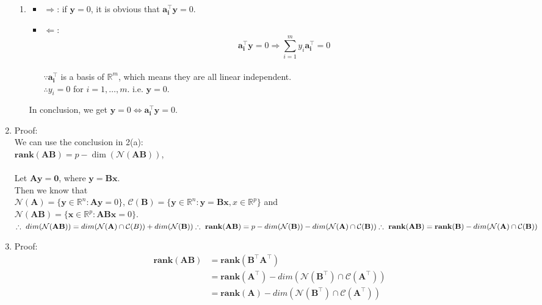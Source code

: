 \documentclass[11pt,letter,notitlepage]{article}
\newcommand{\rank}[1]{ \textbf{rank}  (#1)  }
\begin{document}
\begin{solution}
\begin{enumerate}
\begin{enumerate}
            \item 
            \begin{itemize}
                \item $\Rightarrow$: if $\mathbf{y}=0$, it is obvious that $\mathbf{a_{i}^{\top}y}=0.$\\
                \item $\Leftarrow$: $$\mathbf{a_{i}^{\top}y}=0 \Rightarrow \sum_{i=1}^{m}{y_i\mathbf{a_i^{\top}}=0}$$\\
                $\because \mathbf{a_i^{\top}}$ is a basis of $\mathbb{R}^m$, which means they are all linear independent.\\
                $\therefore y_i=0$ for $i = 1,\dots,m$. i.e. $\mathbf{y}=0.$
            \end{itemize} 
            In conclusion, we get $\mathbf{y}=0 \Leftrightarrow \mathbf{a_{i}^{\top}y}=0$.
        \end{enumerate}
		
		\item Proof:\\
		We can use the conclusion in 2(a):\\
		$\rank{\mathbf{AB}}=p-\dim ( \mathcal{N}( \mathbf{AB} ) )$, \\\\
		Let $\mathbf{Ay=0}$, where $\mathbf{y=Bx}$.\\
		Then we know that \\
		$\mathcal{N}(\mathbf{A})  = \{ \mathbf{y}\in \mathbb{R}^n : \mathbf{Ay}=0\}$, $\mathcal{C}(\mathbf{B})  = \{ \mathbf{y}\in \mathbb{R}^n : \mathbf{y=Bx},x\in\mathbb{R}^p\}$ and \\
		$\mathcal{N}(\mathbf{AB})  = \{ \mathbf{x}\in \mathbb{R}^p : \mathbf{ABx}=0\}$.\\
		$\therefore~dim(\mathcal{N}(\mathbf{AB}))=dim(\mathcal{N}(\mathbf{A})\cap \mathcal{C}(B))+dim(\mathcal{N}(\mathbf{B}))\\
		\therefore ~\rank{\mathbf{AB}}=p-dim(\mathcal{N}(\mathbf{B}))-dim(\mathcal{N}(\mathbf{A})\cap\mathcal{C}(\mathbf{B}))\\
		\therefore~\rank{\mathbf{AB}}=\rank{\mathbf{B}}-dim(\mathcal{N}(\mathbf{A})\cap\mathcal{C}(\mathbf{B}))$
		
		\item Proof:
		\begin{align*}
			\rank{\mathbf{AB}}
			&=\rank{\mathbf{B^{\top}A^{\top}}}\\
			&=\rank{\mathbf{A^{\top}}}-dim(\mathcal{N}(\mathbf{B^{\top}})\cap\mathcal{C}(\mathbf{A^{\top}}))\\
			&=\rank{\mathbf{A}}-dim(\mathcal{N}(\mathbf{B^{\top}})\cap\mathcal{C}(\mathbf{A^{\top}}))
		\end{align*}
		

\end{enumerate}
\end{solution}
\end{document}
